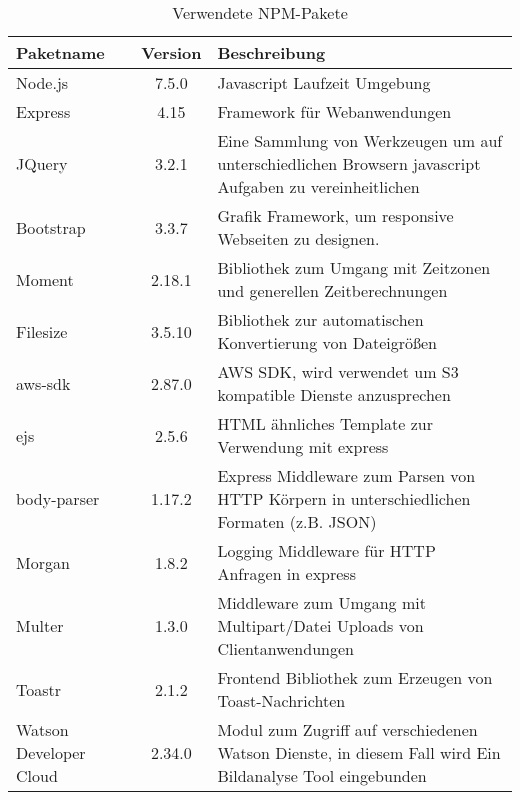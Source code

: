 \begin{table}
	\centering
		\begin{tabular}{ l | c | p{10cm}}
			\hline
			Paketname & Version & Beschreibung \\ \hline
			Node.js & 7.5.0 & Javascript Laufzeit Umgebung \\
			Express & 4.15 & Framework für Webanwendungen \\
			JQuery & 3.2.1 & Eine Sammlung von Werkzeugen um auf unterschiedlichen Browsern javascript Aufgaben zu vereinheitlichen \\
			Bootstrap & 3.3.7 & Grafik Framework, um responsive Webseiten zu designen. \\
			Moment & 2.18.1 & Bibliothek zum Umgang mit Zeitzonen und generellen Zeitberechnungen \\
			Filesize & 3.5.10 & Bibliothek zur automatischen Konvertierung von Dateigrößen \\
			aws-sdk & 2.87.0 & AWS SDK, wird verwendet um S3 kompatible Dienste anzusprechen \\
			ejs & 2.5.6 & HTML ähnliches Template zur Verwendung mit express \\
			body-parser & 1.17.2 & Express Middleware zum Parsen von HTTP Körpern in unterschiedlichen Formaten (z.B. JSON)\\
			Morgan & 1.8.2 & Logging Middleware für HTTP Anfragen in express \\
			Multer & 1.3.0 & Middleware zum Umgang mit Multipart/Datei Uploads von Clientanwendungen \\
			Toastr & 2.1.2 & Frontend Bibliothek zum Erzeugen von Toast-Nachrichten \\
			Watson Developer Cloud & 2.34.0 & Modul zum Zugriff auf verschiedenen Watson Dienste, in diesem Fall wird Ein Bildanalyse Tool eingebunden
		\end{tabular}
		\caption{Verwendete NPM-Pakete}
		\label{tab:npmpackages}
\end{table}


